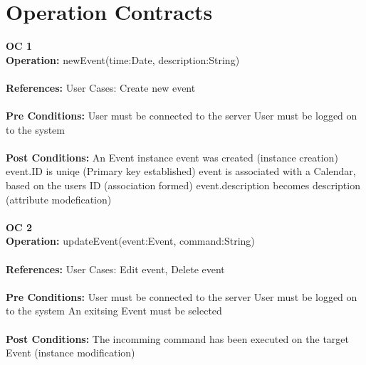\documentclass[a4paper,10pt,titlepage]{article}
\begin{document}
\section{Operation Contracts}
	\textbf{OC 1} \\
	\textbf{Operation:}	newEvent(time:Date, description:String)
	\\ \\
	\textbf{References:}	User Cases:	Create new event
	\\ \\
	\textbf{Pre Conditions:}		
						User must be connected to the server
						User must be logged on to the system
					\\ \\
	\textbf{Post Conditions:}	
						An Event instance event was created (instance creation)
						event.ID is uniqe (Primary key established)
						event is associated with a Calendar, based on the users ID (association formed)
						event.description becomes description (attribute modefication)	
					\\ \\	
	\textbf{OC 2} \\
	\textbf{Operation:}	updateEvent(event:Event, command:String)
	\\ \\
	\textbf{References:}	User Cases:	Edit event, Delete event
	\\ \\
	\textbf{Pre Conditions:}
						User must be connected to the server
						User must be logged on to the system
						An exitsing Event must be selected
	\\ \\	
	\textbf{Post Conditions:}
						The incomming command has been executed on the target Event (instance modification)
						
						
\end{document}
